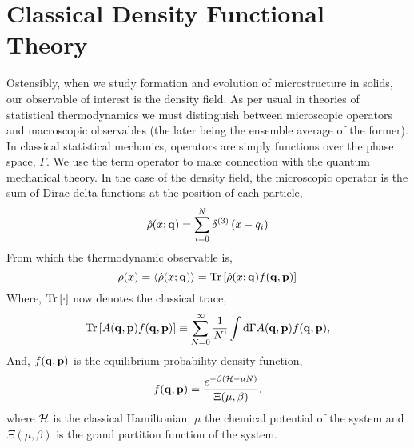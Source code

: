 \section{Classical Density Functional Theory}  %

Ostensibly, when we study formation and evolution of microstructure in solids,
our observable of interest is the density field.  As per usual in theories of
statistical thermodynamics we must distinguish between microscopic operators
and macroscopic observables (the later being the ensemble average of the
former).  In classical statistical mechanics, operators are simply functions
over the phase space, $\Gamma$.  We use the term operator to make connection
with the quantum mechanical theory.  In the case of the density field, the
microscopic operator is the sum of Dirac delta functions at the position of each
particle,
%
\begin{equation} 
    \hat{\rho}(x; \mathbf{q}) = \sum_{i = 0}^N \delta^{(3)}\left(x - q_i\right)
\end{equation}
%
From which the thermodynamic observable is, 
%
\begin{equation} 
    \label{mean_density} 
    \rho(x) = \left\langle \hat{\rho}(x; \mathbf{q}) \right\rangle = 
        \mathrm{Tr}\left[ \hat{\rho}(x; \mathbf{q}) f(\mathbf{q}, \mathbf{p}) \right]
\end{equation}
%
Where, $\mathrm{Tr}\left[ \cdot \right]$ now denotes the classical trace,
%
\begin{equation}
    \mathrm{Tr}\left[ A(\mathbf{q}, \mathbf{p}) f(\mathbf{q}, \mathbf{p}) \right] \equiv \sum_{N =0}^\infty
        \frac{1}{N!}\int\mathrm{d}\Gamma A(\mathbf{q}, \mathbf{p}) f(\mathbf{q}, \mathbf{p}), 
\end{equation}
%
And, $f(\mathbf{q}, \mathbf{p})$ is the equilibrium probability density function,
%
\begin{equation} 
    f(\mathbf{q}, \mathbf{p}) = \frac{e^{-\beta (\mathcal{H} - \mu N)}}{\Xi(\mu, \beta)}.
\end{equation}
%
where $\mathcal{H}$ is the classical Hamiltonian, $\mu$ the chemical potential of the
system and $\Xi(\mu,\beta)$ is the grand partition function of the system.

